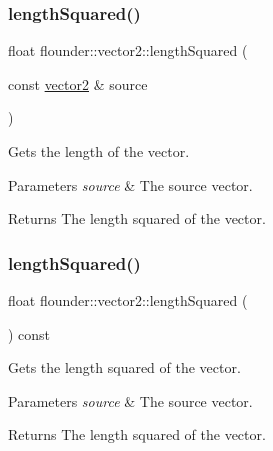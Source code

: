 \subsubsection{\texorpdfstring{length\+Squared()}{lengthSquared()}\hspace{0.1cm}{\footnotesize\ttfamily [1/2]}}
{\footnotesize\ttfamily float flounder\+::vector2\+::length\+Squared (\begin{DoxyParamCaption}\item[{const \hyperlink{classflounder_1_1vector2}{vector2} \&}]{source }\end{DoxyParamCaption})\hspace{0.3cm}{\ttfamily [static]}}



Gets the length of the vector. 


\begin{DoxyParams}{Parameters}
{\em source} & The source vector. \\
\hline
\end{DoxyParams}
\begin{DoxyReturn}{Returns}
The length squared of the vector. 
\end{DoxyReturn}
\mbox{\label{classflounder_1_1vector2_a1ba7dc651130977773db243dcd02be3f}} 
\subsubsection{\texorpdfstring{length\+Squared()}{lengthSquared()}\hspace{0.1cm}{\footnotesize\ttfamily [2/2]}}
{\footnotesize\ttfamily float flounder\+::vector2\+::length\+Squared (\begin{DoxyParamCaption}{ }\end{DoxyParamCaption}) const}



Gets the length squared of the vector. 


\begin{DoxyParams}{Parameters}
{\em source} & The source vector. \\
\hline
\end{DoxyParams}
\begin{DoxyReturn}{Returns}
The length squared of the vector. 
\end{DoxyReturn}
\mbox{\label{classflounder_1_1vector2_a598ef8a41204d55d897ef53da7fb0fb8}} 
